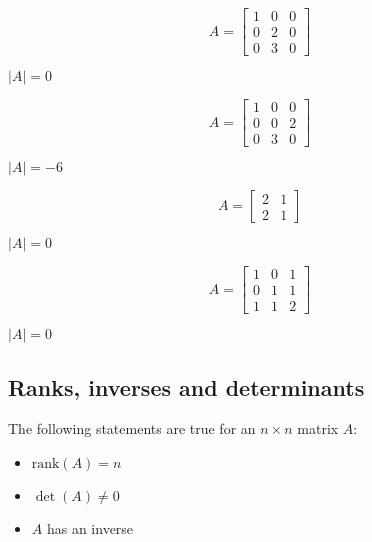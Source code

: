 \documentclass[12pt,a4paper]{article}
\theoremstyle{regla}
\theoremstyle{remark}
\theoremstyle{definition}
\theoremstyle{nonumberbreak}
\begin{document}
\begin{xmpl}


$$A=
\begin{bmatrix}
1 & 0 & 0  \\
0 & 2 & 0  \\
0 & 3 & 0 
\end{bmatrix}$$

$\vert A \vert = 0$


\end{xmpl}
\begin{xmpl}

$$A=
\begin{bmatrix}
1 & 0 & 0  \\
0 & 0 & 2  \\
0 & 3 & 0 
\end{bmatrix}$$

$\vert A \vert = -6$
\end{xmpl}
\begin{xmpl}


$$A=
\begin{bmatrix}
2 & 1  \\
2 & 1 
\end{bmatrix}$$

$\vert A \vert = 0$
\end{xmpl}
\begin{xmpl}


$$A=
\begin{bmatrix}
1 & 0 & 1  \\
0 & 1 & 1  \\
1 & 1 & 2 
\end{bmatrix}$$

$\vert A \vert = 0$
\end{xmpl}

\subsection{Ranks, inverses and determinants}
\begin{fbox}
\begin{minipage}{0.97\textwidth}
The following statements are true for an $n\times n$ matrix $A$:
\begin{itemize}
\item $\text{rank} (A)= n$
\item $\det(A)\neq 0$
\item $A$ has an inverse
\end{itemize}
\end{minipage}
\end{fbox}
\end{document}
